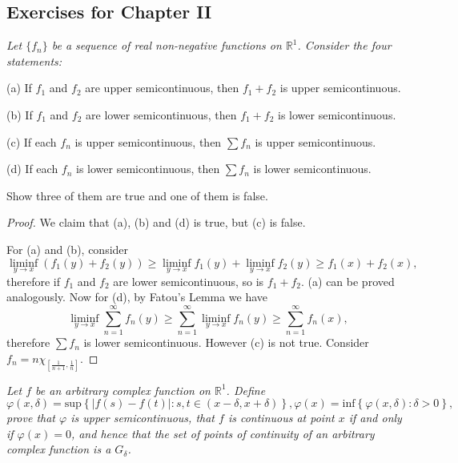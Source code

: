 \subsection{Exercises for Chapter II}
\begin{problem}\em
Let $\{f_n\}$ be a sequence of real non-negative functions on $\mathbb{R}^1$. Consider the four statements:\par
(a) If $f_1$ and $f_2$ are upper semicontinuous, then $f_1+f_2$ is upper semicontinuous.\par
(b) If $f_1$ and $f_2$ are lower semicontinuous, then $f_1+f_2$ is lower semicontinuous.\par
(c) If each $f_n$ is upper semicontinuous, then $\sum f_n$ is upper semicontinuous.\par
(d) If each $f_n$ is lower semicontinuous, then $\sum f_n$ is lower semicontinuous.\par
Show three of them are true and one of them is false.
\end{problem}
\begin{proof}
We claim that (a), (b) and (d) is true, but (c) is false.\par
For (a) and (b), consider 
$$\liminf_{y\to x}(f_1(y)+f_2(y))\ge\liminf_{y\to x}f_1(y)+\liminf_{y\to x}f_2(y)\ge f_1(x)+f_2(x),$$
therefore if $f_1$ and $f_2$ are lower semicontinuous, so is $f_1+f_2$. (a) can be proved analogously. Now for (d), by Fatou's Lemma we have 
$$\liminf_{y\to x}\sum_{n=1}^\infty f_n(y)\ge\sum_{n=1}^\infty\liminf_{y\to x}f_n(y)\ge\sum_{n=1}^\infty f_n(x),$$
therefore $\sum f_n$ is lower semicontinuous. However (c) is not true. Consider $f_n=n\chi_{\left[\frac{1}{n+1},\frac{1}{n}\right]}$.
\end{proof}
\begin{problem}\em
Let $f$ be an arbitrary complex function on $\mathbb{R}^1$. Define 
$$
\varphi \left( x,\delta \right) =\mathrm{sup}\left\{ \left| f\left( s \right) -f\left( t \right) \right|:s,t\in \left( x-\delta ,x+\delta \right) \right\} ,\varphi \left( x \right) =\mathrm{inf}\left\{ \varphi \left( x,\delta \right) :\delta >0 \right\} ,
$$
prove that $\varphi$ is upper semicontinuous, that $f$ is continuous at point $x$ if and only if $\varphi(x)=0$, and hence that the set of points of continuity of an arbitrary complex function is a $G_\delta$.
\end{problem}
